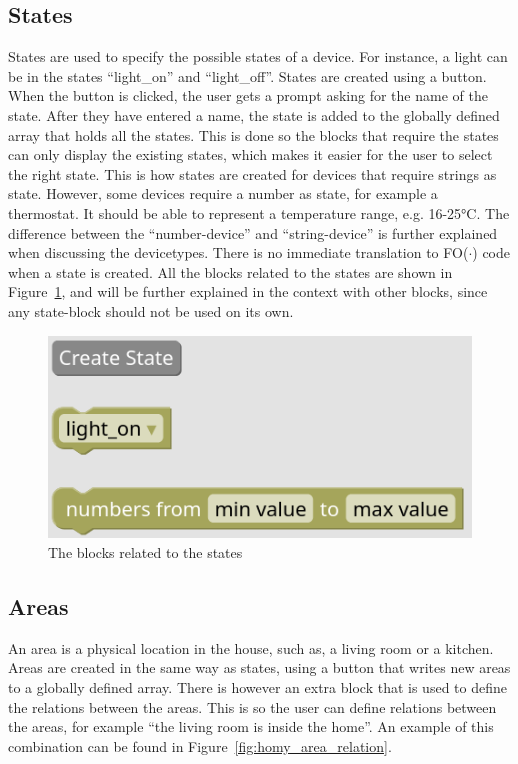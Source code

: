 \documentclass[11pt,a4paper]{report}
\newcommand{\fodot}{FO($\cdot$)\xspace}
\begin{document}
\subsection{States}
States are used to specify the possible states of a device. For instance, a light can be in the states ``light\_on'' and ``light\_off''. States are created using a button. When the button is clicked, the user gets a prompt asking for the name of the state. After they have entered a name, the state is added to the globally defined array that holds all the states. This is done so the blocks that require the states can only display the existing states, which makes it easier for the user to select the right state. This is how states are created for devices that require strings as state. However, some devices require a number as state, for example a thermostat. It should be able to represent a temperature range, e.g. 16-25°C. The difference between the ``number-device'' and ``string-device'' is further explained when discussing the devicetypes. There is no immediate translation to \fodot code when a state is created. All the blocks related to the states are shown in Figure~\ref{fig:homy_state_blocks}, and will be further explained in the context with other blocks, since any state-block should not be used on its own.

\begin{figure}
    \centering
    \includegraphics[width=0.4\linewidth]{images/homy_state_blocks.png}
    \caption{The blocks related to the states}
    \label{fig:homy_state_blocks}
\end{figure}

\subsection{Areas}
An area is a physical location in the house, such as, a living room or a kitchen. Areas are created in the same way as states, using a button that writes new areas to a globally defined array. There is however an extra block that is used to define the relations between the areas. This is so the user can define relations between the areas, for example ``the living room is inside the home''. An example of this combination can be found in Figure~\ref{fig:homy_area_relation}.
\end{document}
